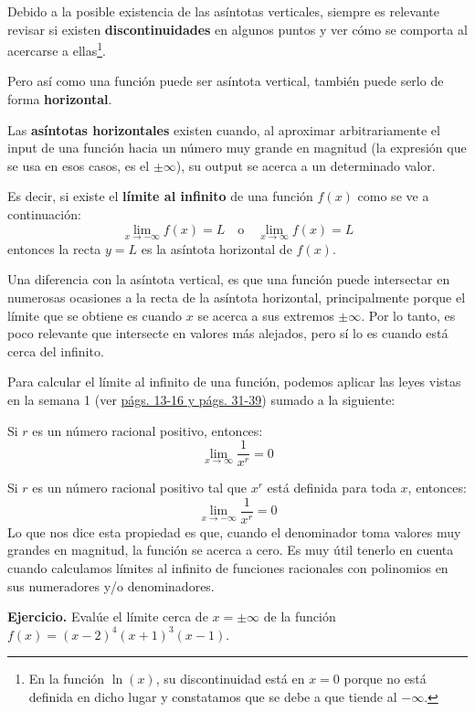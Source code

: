 \documentclass[12pt]{article}
\begin{document}
Debido a la posible existencia de las asíntotas verticales, siempre es relevante revisar si existen \textbf{discontinuidades} en algunos puntos y ver cómo se comporta al acercarse a ellas\footnote{En la función $\ln(x)$, su discontinuidad está en $x = 0$ porque no está definida en dicho lugar y constatamos que se debe a que tiende al $-\infty$.}.

Pero así como una función puede ser asíntota vertical, también puede serlo de forma \textbf{horizontal}.

Las \textbf{asíntotas horizontales} existen cuando, al aproximar arbitrariamente el input de una función hacia un número muy grande en magnitud (la expresión que se usa en esos casos, es el $\pm \infty$), su output se acerca a un determinado valor.

Es decir, si existe el \textbf{límite al infinito} de una función $f(x)$ como se ve a continuación:
\[
	\lim_{x \to -\infty} f(x) = L
	\quad \text{o} \quad
	\lim_{x \to \infty} f(x) = L
\]
entonces la recta $y = L$ es la asíntota horizontal de $f(x)$.

Una diferencia con la asíntota vertical, es que una función puede intersectar en numerosas ocasiones a la recta de la asíntota horizontal, principalmente porque el límite que se obtiene es cuando $x$ se acerca a sus extremos $\pm \infty$. Por lo tanto, es poco relevante que intersecte en valores más alejados, pero sí lo es cuando está cerca del infinito.


Para calcular el límite al infinito de una función, podemos aplicar las leyes vistas en la semana 1 (ver \href{../week-1/week_1.pdf}{págs. 13-16 y págs. 31-39}) sumado a la siguiente:

Si $r$ es un número racional positivo, entonces:
\[\lim_{x \to \infty} \frac{1}{x^{r}} = 0\]

\newpage

Si $r$ es un número racional positivo tal que $x^{r}$ está definida para toda $x$, entonces:
\[\lim_{x \to -\infty} \frac{1}{x^{r}} = 0\]
Lo que nos dice esta propiedad es que, cuando el denominador toma valores muy grandes en magnitud, la función se acerca a cero.
Es muy útil tenerlo en cuenta cuando calculamos límites al infinito de funciones racionales con polinomios en sus numeradores y/o denominadores.

\textbf{Ejercicio.} \quad Evalúe el límite cerca de $x = \pm \infty$ de la función $f(x) = (x - 2)^{4}(x + 1)^{3}(x - 1)$.
\end{document}
